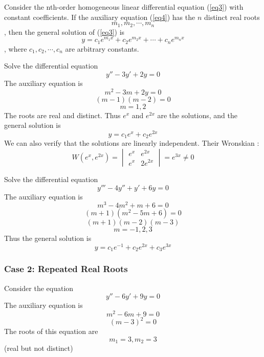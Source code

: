 \begin{theorem}{}{}
    Consider the nth-order homogeneous linear differential equation (\ref{eq3}) with constant coefficients. If the auxiliary equation (\ref{eq4}) has the $n$ distinct real roots \[
        m_1, m_2, \cdots, m_n
    \], then the general solution of (\ref{eq3}) is \[
        y = c_1e^{m_1x} + c_2e^{m_2x} + \cdots + c_ne^{m_nx}
    \], where $c_1, c_2, \cdots, c_n$ are arbitrary constants.
\end{theorem}

\begin{example}{
    Solve the differential equation \[
        y'' - 3y' + 2y = 0
\] }{}\vspace{-20pt}
    The auxiliary equation is \[
        m^2 - 3m + 2y = 0
    \]\[ (m-1)(m-2) = 0 \]
    \[ m = 1,2 \]
    The roots are real and distinct. Thus $e^{x}$ and $e^{2x}$ are the solutions, and the general solution is \[
        y = c_1e^{x} + c_2e^{2x}
    \]
    We can also verify that the solutions are linearly independent. Their Wronskian : \[
        W(e^{x}, e^{2x}) =
        \begin{vmatrix}
            e^{x} & e^{2x} \\
            e^{x} & 2e^{2x}
        \end{vmatrix} = e^{3x} \neq 0
    \]
\end{example}

\begin{example}{
    Solve the differential equation \[
        y''' - 4y'' + y' + 6y = 0
\]}{}\vspace{-20pt}
    The auxiliary equation is \[
        m^3 - 4m^2 + m + 6 = 0
    \]\[ (m+1)(m^2-5m+6) = 0 \]
    \[ (m+1)(m-2)(m-3) \]
    \[ m = -1, 2, 3 \]
    Thus the general solution is \[
        y = c_1e^{-1} + c_2e^{2x} + c_3e^{3x}
    \]
\end{example}

\vspace{20pt}
\subsubsection{Case 2: Repeated Real Roots}

\begin{example}{Consider the equation
    \begin{equation}
        y'' - 6y' + 9y = 0
    \end{equation}
}{}\vspace{-20pt}
    The auxiliary equation is \[
        m^2 - 6m + 9 = 0
    \]\[ (m-3)^2 = 0 \]
    The roots of this equation are \[
        m_1 = 3, m_2 = 3
    \] (real but not distinct)
\end{example}

